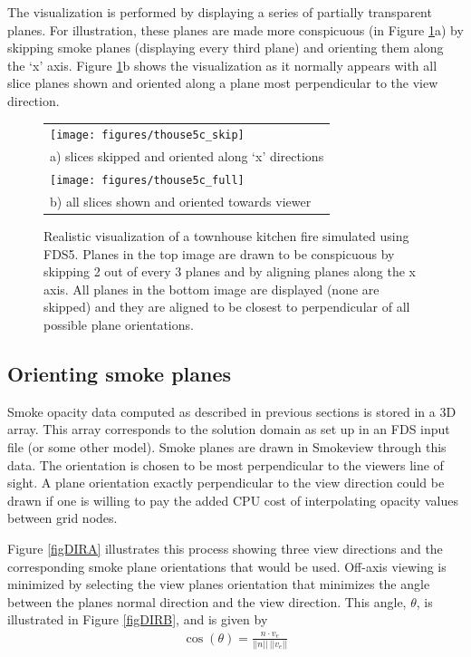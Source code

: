 The visualization is performed by displaying a series of partially
transparent planes. For illustration, these planes are made more
conspicuous (in Figure \ref{figsmoke3d}a) by skipping smoke planes
(displaying every third plane) and orienting them along the `x'
axis. Figure \ref{figsmoke3d}b shows the visualization as it
normally appears with all slice planes shown and oriented along a
plane most perpendicular to the view direction.
\begin{figure}[\figoptions]
\begin{center}
\begin{tabular}{l}
\texttt{[image: figures/thouse5c\_skip]}\\
a) slices skipped and oriented along `x' directions\\
\texttt{[image: figures/thouse5c\_full]}\\
b) all slices shown and oriented towards viewer \\
\end{tabular}
\end{center}
\caption{Realistic visualization of a townhouse kitchen fire simulated
using FDS5. Planes in the top image are drawn to be conspicuous by
skipping 2 out of every 3 planes and by aligning planes along the
x axis. All planes in the bottom image are displayed (none are
skipped) and they are aligned to be closest to perpendicular of
all possible plane orientations.
  }
\label{figsmoke3d}%
\end{figure}

%
%

\subsection{Orienting smoke planes}

Smoke opacity data computed as described in previous sections is
stored in a 3D array. This array corresponds to the solution
domain as set up in an FDS input file (or some other model). Smoke
planes are drawn in Smokeview through this data.  The orientation
is chosen to be most perpendicular to the viewers line of sight. A
plane orientation exactly perpendicular to the view direction
could be drawn if one is willing to pay the added CPU cost of
interpolating opacity values between grid nodes.

Figure \ref{figDIRA} illustrates this process showing three view
directions and the corresponding smoke plane orientations that
would be used. Off-axis viewing is minimized by selecting the view
planes orientation that minimizes the angle between the planes
normal direction and the view direction. This angle, $\theta$, is
illustrated in Figure \ref{figDIRB}, and is given by
\begin{eqnarray*}
\cos(\theta)=\frac{n\cdot v_e}{||n||~||v_e||}
\end{eqnarray*}

